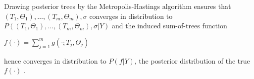 

Drawing posterior trees by the Metropolis-Hastings algorithm \cite{MH} ensures that $(T_1, \Theta_1), \ldots, (T_m, \Theta_m), \sigma$ converges in distribution to $P((T_1, \Theta_{1}), \ldots, (T_m, \Theta_m), \sigma|Y)$ and the induced sum-of-trees function 
\begin{center}
    $f(\cdot) = \sum_{j=1}^{m}g(\cdot; T_j, \Theta_j)$
\end{center}
hence converges in distribution to $P(f|Y)$, the posterior distribution of the true $f(\cdot)$ \cite{BART}.